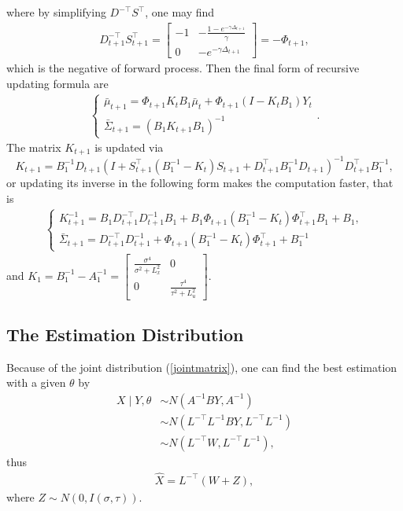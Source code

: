 where by simplifying $D^{-\top}S^\top$, one may find 
\begin{align*}
D_{t+1}^{-\top}S_{t+1}^\top = \begin{bmatrix}
-1 & -\frac{1-e^{-\gamma \Delta_{t+1}}}{\gamma} \\ 0 & - e^{-\gamma \Delta_{t+1}}
\end{bmatrix} = -\Phi_{t+1},
\end{align*}
which is the negative of forward process. Then the final form of recursive updating formula are 
\begin{align}
\begin{cases}
\bar{\mu}_{t+1}=\Phi_{t+1} K_tB_1\bar{\mu}_t + \Phi_{t+1} \left(I-K_tB_1\right)Y_t\\
\bar{\Sigma}_{t+1}=\left( B_1K_{t+1}B_1  \right)^{-1}
\end{cases}.
\end{align}
The matrix $K_{t+1}$ is updated via 
\begin{equation}
K_{t+1} =B_1^{-1}D_{t+1} \left(I+ S_{t+1}^\top \left(B_1^{-1} - K_t\right)  S_{t+1} +D_{t+1}^\top B_1^{-1}D_{t+1}  \right)^{-1}  D_{t+1}^\top B_1^{-1},
\end{equation}
or updating its inverse in the following form makes the computation faster, that is 
\begin{align*}
\begin{cases}
K_{t+1}^{-1} = B_1D_{t+1}^{-\top}D_{t+1}^{-1}B_1 + B_1\Phi_{t+1} \left(B_1^{-1} - K_t\right) \Phi_{t+1}^\top B_1+ B_1,\\
\bar{\Sigma}_{t+1} = D_{t+1}^{-\top}D_{t+1}^{-1}+ \Phi_{t+1} \left(B_1^{-1} - K_t\right) \Phi_{t+1}^\top + B_1^{-1}
\end{cases}
\end{align*}
and $K_1 =B_1^{-1} - A_1^{-1} = \begin{bmatrix}
\frac{\sigma^4}{\sigma^2 +L_x^2} & 0 \\ 0 &\frac{\tau^4}{\tau^2 +L_u^2}
\end{bmatrix} $.



\subsection*{The Estimation Distribution}

Because of the joint distribution (\ref{jointmatrix}), one can find the best estimation with a given $\theta$ by
\begin{align*}
X \mid Y,\theta &\sim N \left( A^{-1}BY, A^{-1} \right) \\
&\sim N\left(L^{-\top}L^{-1}BY,L^{-\top}L^{-1}\right)\\
&\sim N\left(L^{-\top}W,L^{-\top}L^{-1}\right),
\end{align*}
thus
\begin{align*}
\hat{X} = L^{-\top}\left(W+Z\right),
\end{align*}
where $Z \sim N\left(0, I\left(\sigma,\tau\right)\right)$.


